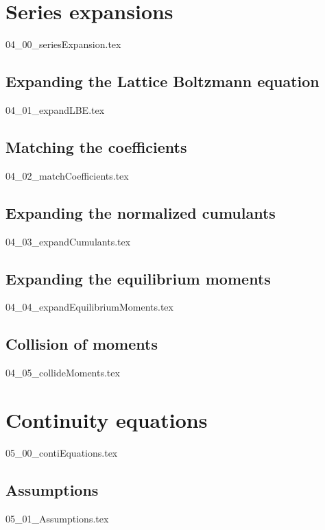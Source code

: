 \documentclass[12pt,a4paper,twoside]{article}
\begin{document}
\section{Series expansions}
\label{sec: Series expansions}
{04_00_seriesExpansion.tex}


\subsection{Expanding the Lattice Boltzmann equation}
\label{sub: Expanding the Lattice Boltzmann equation}
{04_01_expandLBE.tex}

\subsection{Matching the coefficients}
\label{sub: Matching the coefficients}
{04_02_matchCoefficients.tex}

\subsection{Expanding the normalized cumulants}
\label{sub: Expanding the normalized cumulants}
{04_03_expandCumulants.tex}

\subsection{Expanding the equilibrium moments}
\label{sub: Expanding the equilibrium moments}
{04_04_expandEquilibriumMoments.tex}

\subsection{Collision of moments}
\label{sub: Collision of moments}
{04_05_collideMoments.tex}

\section{Continuity equations}
\label{sec: Continuity equations}
{05_00_contiEquations.tex}

\subsection{Assumptions}
\label{sub: Assumptions}
{05_01_Assumptions.tex}
\end{document}
